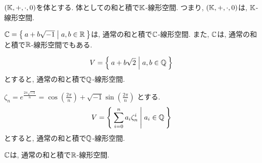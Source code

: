 \begin{example}
  $(\mathbb{K},+,\cdot,0)$を体とする.
  体としての和と積で$\mathbb{K}$-線形空間.
  つまり, $(\mathbb{K},+,\cdot,0)$は, $\mathbb{K}$-線形空間.
\end{example}

\begin{example}
  $\mathbb{C}=\Set{a+b\sqrt{-1}|a,b\in \mathbb{R}}$は,
  通常の和と積で$\mathbb{C}$-線形空間.
  また,
  $\mathbb{C}$は,
  通常の和と積で$\mathbb{R}$-線形空間でもある.
\end{example}

\begin{example}
  \begin{align*}
    V=\Set{a+b\sqrt{2}|a,b\in\mathbb{Q}}
  \end{align*}
  とすると,
  通常の和と積で$\mathbb{Q}$-線形空間.
\end{example}

\begin{example}
  $\zeta_n= e^{\frac{2\pi\sqrt{-1}}{n}}=\cos(\frac{2\pi}{n})+\sqrt{-1}\sin(\frac{2\pi}{n})$
  とする.
  \begin{align*}
    V=\Set{\sum_{i=0}^{n}a_i\zeta_n^i|a_i\in\mathbb{Q}}
  \end{align*}
  とすると,
  通常の和と積で$\mathbb{Q}$-線形空間.
\end{example}

\begin{example}
  $\mathbb{C}$は,
  通常の和と積で$\mathbb{R}$-線形空間.
\end{example}



